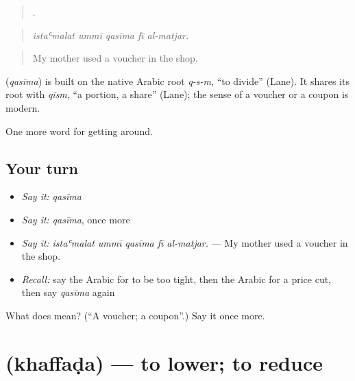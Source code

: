 \begin{quote}
    .
\end{quote}

\begin{quote}
\emph{istaʿmalat ummī qasīma fī al-matjar.}
\end{quote}

\begin{quote}
My mother used a voucher in the shop.
\end{quote}

\begin{cousinweb}
\textbf{} (\emph{qasīma}) is built on the native Arabic root \emph{q-s-m}, \textquotedblleft{}to divide\textquotedblright{} (Lane). It shares its root with \emph{qism}, \textquotedblleft{}a portion, a share\textquotedblright{} (Lane); the sense of a voucher or a coupon is modern.
\end{cousinweb}

\begin{grammarlens}[title={What you've built}]
One more word for getting around.
\end{grammarlens}

\subsection*{Your turn}
\begin{itemize}
\raggedright
  \item \emph{Say it:} \emph{qasīma}
  \item \emph{Say it:} \emph{qasīma}, once more
  \item \emph{Say it:} \emph{istaʿmalat ummī qasīma fī al-matjar.} — My mother used a voucher in the shop.
  \item \emph{Recall:} say the Arabic for to be too tight, then the Arabic for a price cut, then say \emph{qasīma} again
\end{itemize}

\begin{tcolorbox}[breakable,colback=teal!4,colframe=teal!35!black,title={Before you move on}]
What does  mean? (\textquotedblleft{}A voucher; a coupon\textquotedblright{}.) Say it once more.
\end{tcolorbox}
\section[\texorpdfstring{\ar{خفض} (khaffaḍa)}{خفض (khaffaḍa)}]{ (khaffaḍa) — to lower; to reduce}


